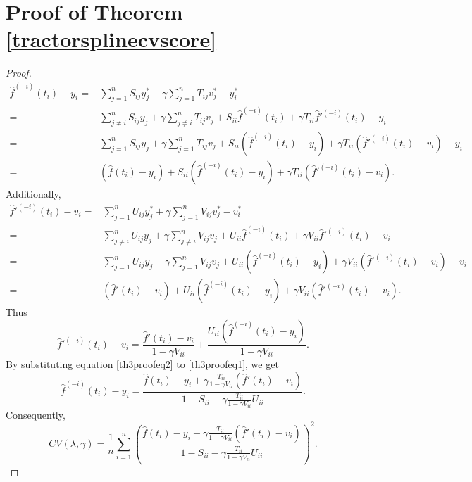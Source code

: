 \section{Proof of Theorem \ref{tractorsplinecvscore}}

\begin{proof}
\begin{equation}\label{th3proofeq1}
\begin{split}
\hat{f}^{(-i)}(t_i)-y_i=& \sum_{j=1}^{n}S_{ij}y_j^*+ \gamma \sum_{j=1}^{n}T_{ij}v_j^*-y_i^*\\
=&\sum_{j\neq i}^{n}S_{ij}y_j+ \gamma \sum_{j\neq i}^{n}T_{ij}v_j+S_{ii}\hat{f}^{(-i)}(t_i)+\gamma T_{ii}\hat{f}'^{(-i)}(t_i)-y_i\\
=&\sum_{j=1}^{n}S_{ij}y_j+ \gamma \sum_{j=1}^{n}T_{ij}v_j+S_{ii}\left(\hat{f}^{(-i)}(t_i)-y_i\right)+\gamma T_{ii}\left(\hat{f}'^{(-i)}(t_i)-v_i\right)-y_i\\
=&\left(\hat{f}(t_i)-y_i\right)+S_{ii}\left(\hat{f}^{(-i)}(t_i)-y_i\right)+\gamma T_{ii}\left(\hat{f}'^{(-i)}(t_i)-v_i\right).
\end{split}
\end{equation}
Additionally, 
\begin{equation}
\begin{split}
\hat{f}'^{(-i)}(t_i)-v_i=& \sum_{j=1}^{n}U_{ij}y_j^*+ \gamma \sum_{j=1}^{n}V_{ij}v_j^*-v_i^*\\
=&\sum_{j\neq i}^{n}U_{ij}y_j+ \gamma \sum_{j\neq i}^{n}V_{ij}v_j+U_{ii}\hat{f}^{(-i)}(t_i)+\gamma V_{ii}\hat{f}'^{(-i)}(t_i)-v_i\\
=&\sum_{j=1}^{n}U_{ij}y_j+ \gamma \sum_{j=1}^{n}V_{ij}v_j+U_{ii}\left(\hat{f}^{(-i)}(t_i)-y_i\right)+\gamma V_{ii}\left(\hat{f}'^{(-i)}(t_i)-v_i\right)-v_i\\
=&\left(\hat{f}'(t_i)-v_i\right)+U_{ii}\left(\hat{f}^{(-i)}(t_i)-y_i\right)+\gamma V_{ii}\left(\hat{f}'^{(-i)}(t_i)-v_i\right).
\end{split}
\end{equation}
Thus 
\begin{equation}\label{th3proofeq2}
\hat{f}'^{(-i)}(t_i)-v_i = \frac{\hat{f}'(t_i)-v_i}{1-\gamma V_{ii}}+ \frac{U_{ii}\left(\hat{f}^{(-i)}(t_i)-y_i\right)}{1-\gamma V_{ii}}.
\end{equation}
By substituting equation \eqref{th3proofeq2} to \eqref{th3proofeq1}, we get
\begin{equation*}
\hat{f}^{(-i)}(t_i)-y_i=\frac{\hat{f}(t_i)-y_i+\gamma \frac{T_{ii}}{1-\gamma V_{ii}}\left(\hat{f}'(t_i)-v_i\right)}{1-S_{ii}-\gamma\frac{T_{ii}}{1-\gamma V_{ii}}U_{ii}}.
\end{equation*}
Consequently, 
\begin{equation*}
CV(\lambda,\gamma)=\frac{1}{n}\sum_{i=1}^{n}\left( \frac{\hat{f}(t_i)-y_i+\gamma \frac{T_{ii}}{1-\gamma V_{ii}}\left(\hat{f}'(t_i)-v_i\right)}{1-S_{ii}-\gamma\frac{T_{ii}}{1-\gamma V_{ii}}U_{ii}}\right)^2.
\end{equation*}
\end{proof}


